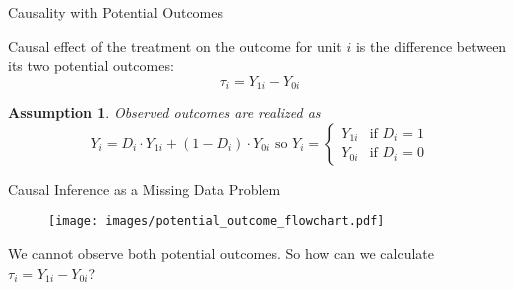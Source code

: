 \documentclass{beamer}
\newtheorem{assumption}{Assumption}
\numberwithin{equation}{section}
\begin{document}
\begin{frame}{Causality with Potential Outcomes}

\begin{definition}
Causal effect of the treatment on the outcome
for unit $i$ is the difference between its two potential outcomes:
\[
\tau_i = Y_{1i} - Y_{0i}
\]
\end{definition}

\begin{assumption}
Observed outcomes are realized as
\[
Y_i = D_i\cdot Y_{1i} + (1-D_i)\cdot Y_{0i}\,\, \mbox{so}\,\,
Y_i = \left\{
 \begin{array}{ll}
  Y_{1i} & \mbox{if $D_i=1$}\\
  Y_{0i} & \mbox{if $D_i=0$}
 \end{array}
 \right.
\]
\end{assumption}



\end{frame}

\begin{frame}{Causal Inference as a Missing Data Problem}

\begin{figure}[ht] \centering
    \texttt{[image: images/potential\_outcome\_flowchart.pdf]}
\end{figure}


\begin{definition}
We cannot observe both potential outcomes. So how can we calculate $\tau_i = Y_{1i} - Y_{0i}$?
\end{definition}

\end{frame}
\end{document}
